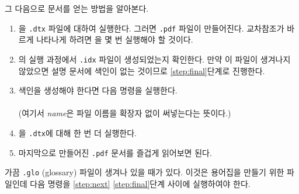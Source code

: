 \noindent 그 다음으로 문서를 얻는 방법을 알아본다.

\begin{enumerate}
\item {}을 \texttt{.dtx} 파일에 대하여 실행한다. 그러면 \texttt{.pdf} 파일이 만들어진다. 교차참조가 바르게 나타나게 하려면 \XeLaTeX 을 몇 번 실행해야 할 것이다.
\item \XeLaTeX 의 실행 과정에서 \texttt{.idx} 파일이 생성되었는지 확인한다. 만약 이 파일이 생겨나지 않았으면 설명 문서에 색인이 없는 것이므로 \ref{step:final}단계로 진행한다.
\item 색인을 생성해야 한다면 다음 명령을 실행한다. \\
        \\
        (여기서 \emph{name}은 파일 이름을 확장자 없이 써넣는다는 뜻이다.)
\item \XeLaTeX 을 \texttt{.dtx}에 대해 한 번 더 실행한다. \label{step:next}
\item 마지막으로 만들어진 \texttt{.pdf} 문서를 즐겁게 읽어보면 된다. \label{step:final}
\end{enumerate}

가끔 \texttt{.glo} (glossary) 파일이 생겨나 있을 때가 있다.
이것은 용어집을 만들기 위한 파일인데 다음 명령을 \ref{step:next}\와 
\ref{step:final}단계 사이에 실행하여야 한다.

